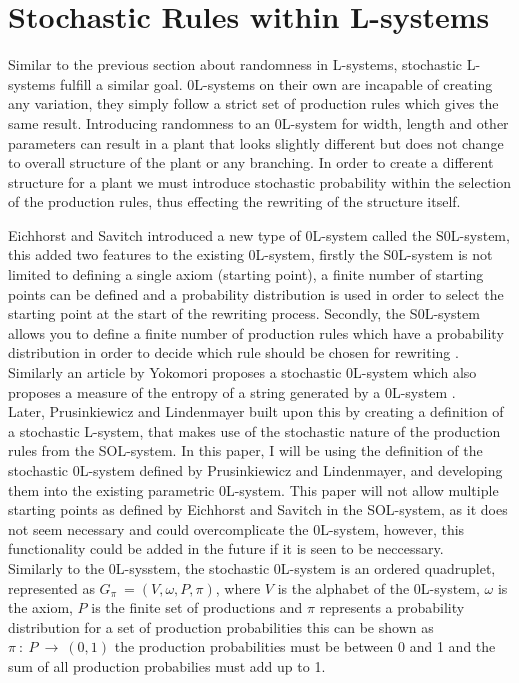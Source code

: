 \section{Stochastic Rules within L-systems} \label{Stochastic L-system Subsection}

\begin{flushleft}

Similar to the previous section about randomness in L-systems, stochastic L-systems fulfill a similar goal. 0L-systems on their own are incapable of creating any variation, they simply follow a strict set of production rules which gives the same result. Introducing randomness to an 0L-system for width, length and other parameters can result in a plant that looks slightly different but does not change to overall structure of the plant or any branching. In order to create a different structure for a plant we must introduce stochastic probability within the selection of the production rules, thus effecting the rewriting of the structure itself. \\

\vspace{5mm}

Eichhorst and Savitch introduced a new type of 0L-system called the S0L-system, this added two features to the existing 0L-system, firstly the S0L-system is not limited to defining a single axiom (starting point), a finite number of starting points can be defined and a probability distribution is used in order to select the starting point at the start of the rewriting process. Secondly, the S0L-system allows you to define a finite number of production rules which have a probability distribution in order to decide which rule should be chosen for rewriting \cite{eichhorst1980growth}. Similarly an article by Yokomori proposes a stochastic 0L-system which also proposes a measure of the entropy of a string generated by a 0L-system \cite{yokomori1980stochastic}.\\
Later, Prusinkiewicz and Lindenmayer built upon this by creating a definition of a stochastic L-system, that makes use of the stochastic nature of the production rules from the SOL-system. In this paper, I will be using the definition of the stochastic 0L-system defined by Prusinkiewicz and Lindenmayer, and developing them into the existing parametric 0L-system. This paper will not allow multiple starting points as defined by Eichhorst and Savitch in the SOL-system, as it does not seem necessary and could overcomplicate the 0L-system, however, this functionality could be added in the future if it is seen to be neccessary. \\
Similarly to the 0L-sysstem, the stochastic 0L-system is an ordered quadruplet, represented as $G_\pi~ = (V, \omega, P, \pi)$, where $V$ is the alphabet of the 0L-system, $\omega$ is the axiom, $P$ is the finite set of productions and $\pi$ represents a probability distribution for a set of production probabilities this can be shown as $\pi~ :~ P~ \rightarrow~ (0, 1)$ the production probabilities must be between 0 and 1 and the sum of all production probabilies must add up to 1. \\


\end{flushleft}
